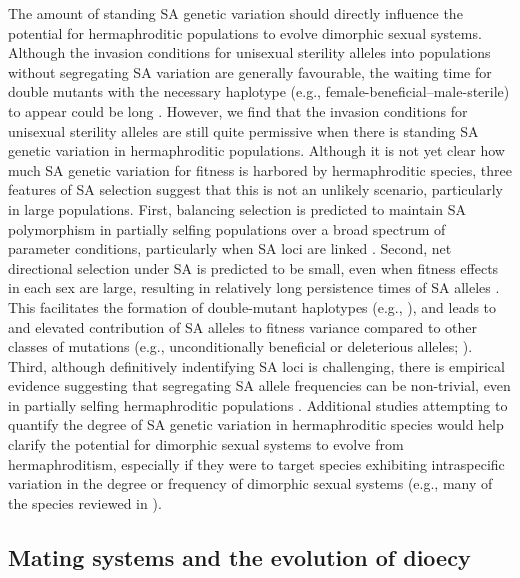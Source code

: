 \documentclass[9pt,twocolumn,twoside,lineno]{gsajnl}
\begin{document}
The amount of standing SA genetic variation should directly influence the potential for hermaphroditic populations to evolve dimorphic sexual systems. Although the invasion conditions for unisexual sterility alleles into populations without segregating SA variation are generally favourable, the waiting time for double mutants with the necessary haplotype (e.g., female-beneficial--male-sterile) to appear could be long \citep{WeinreichChao2005,ConnallonClark2010}. However, we find that the invasion conditions for unisexual sterility alleles are still quite permissive when there is standing SA genetic variation in hermaphroditic populations. Although it is not yet clear how much SA genetic variation for fitness is harbored by hermaphroditic species, three features of SA selection suggest that this is not an unlikely scenario, particularly in large populations. First, balancing selection is predicted to maintain SA polymorphism in partially selfing populations over a broad spectrum of parameter conditions, particularly when SA loci are linked \citep{Patten2010,JordanConnallon2014,Olito2017}. Second, net directional selection under SA is predicted to be small, even when fitness effects in each sex are large, resulting in relatively long persistence times of SA alleles \citep{ConnallonClark2012}. This facilitates the formation of double-mutant haplotypes (e.g., \citealt{WeinreichChao2005}), and leads to and elevated contribution of SA alleles to fitness variance compared to other classes of mutations (e.g., unconditionally beneficial or deleterious alleles; \citealt{ConnallonClark2012}). Third, although definitively indentifying SA loci is challenging, there is empirical evidence suggesting that segregating SA allele frequencies can be non-trivial, even in partially selfing hermaphroditic populations \citep{Barson2015,LeeKelly2015}. Additional studies attempting to quantify the degree of SA genetic variation in hermaphroditic species would help clarify the potential for dimorphic sexual systems to evolve from hermaphroditism, especially if they were to target species exhibiting intraspecific variation in the degree or frequency of dimorphic sexual systems (e.g., many of the species reviewed in \citealt{SakaiWeller1999,Barrett2010,Renner2014}).


\subsection{Mating systems and the evolution of dioecy}
\end{document}
